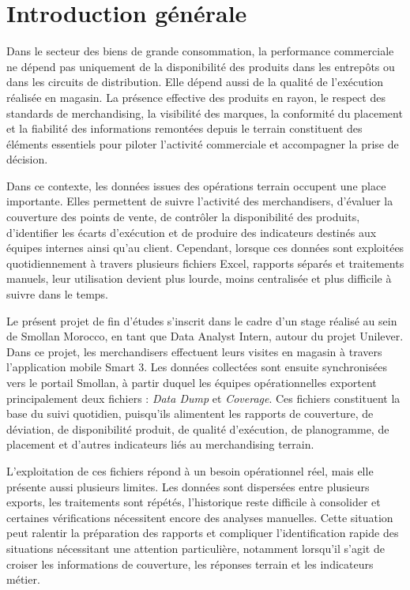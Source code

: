 \chapter*{Introduction générale}

Dans le secteur des biens de grande consommation, la performance commerciale ne dépend pas uniquement de la disponibilité des produits dans les entrepôts ou dans les circuits de distribution. Elle dépend aussi de la qualité de l’exécution réalisée en magasin. La présence effective des produits en rayon, le respect des standards de merchandising, la visibilité des marques, la conformité du placement et la fiabilité des informations remontées depuis le terrain constituent des éléments essentiels pour piloter l’activité commerciale et accompagner la prise de décision.

Dans ce contexte, les données issues des opérations terrain occupent une place importante. Elles permettent de suivre l’activité des merchandisers, d’évaluer la couverture des points de vente, de contrôler la disponibilité des produits, d’identifier les écarts d’exécution et de produire des indicateurs destinés aux équipes internes ainsi qu’au client. Cependant, lorsque ces données sont exploitées quotidiennement à travers plusieurs fichiers Excel, rapports séparés et traitements manuels, leur utilisation devient plus lourde, moins centralisée et plus difficile à suivre dans le temps.

Le présent projet de fin d’études s’inscrit dans le cadre d’un stage réalisé au sein de Smollan Morocco, en tant que Data Analyst Intern, autour du projet Unilever. Dans ce projet, les merchandisers effectuent leurs visites en magasin à travers l’application mobile Smart 3. Les données collectées sont ensuite synchronisées vers le portail Smollan, à partir duquel les équipes opérationnelles exportent principalement deux fichiers : \textit{Data Dump} et \textit{Coverage}. Ces fichiers constituent la base du suivi quotidien, puisqu’ils alimentent les rapports de couverture, de déviation, de disponibilité produit, de qualité d’exécution, de planogramme, de placement et d’autres indicateurs liés au merchandising terrain.

L’exploitation de ces fichiers répond à un besoin opérationnel réel, mais elle présente aussi plusieurs limites. Les données sont dispersées entre plusieurs exports, les traitements sont répétés, l’historique reste difficile à consolider et certaines vérifications nécessitent encore des analyses manuelles. Cette situation peut ralentir la préparation des rapports et compliquer l’identification rapide des situations nécessitant une attention particulière, notamment lorsqu’il s’agit de croiser les informations de couverture, les réponses terrain et les indicateurs métier.

